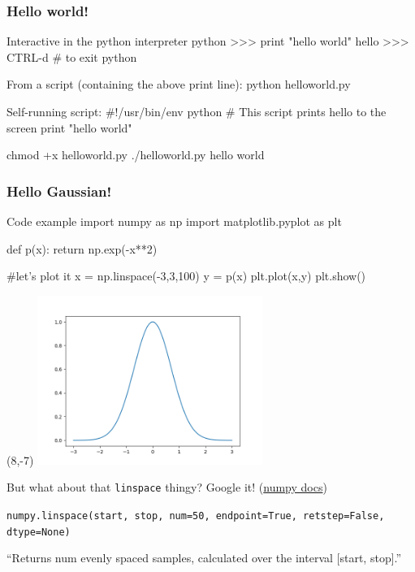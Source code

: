 \documentclass[hyperref={colorlinks=true}]{beamer}
\begin{document}
\begin{frame}[fragile]
  \frametitle{Hello world!}

  \begin{ucpythonblock}{Interactive in the python interpreter}
python
>>> print "hello world"
hello
>>> CTRL-d  # to exit python
  \end{ucpythonblock}
  
  \begin{ucpythonblock}{From a script (containing the above print line):}
python helloworld.py
  \end{ucpythonblock}
  
  \begin{ucpythonblock}{Self-running script:}
#!/usr/bin/env python
# This script prints hello to the screen
print "hello world"
  \end{ucpythonblock}
  
  \begin{ucpythonblock}{}
chmod +x helloworld.py
./helloworld.py
hello world
  \end{ucpythonblock}
  
\end{frame}


\begin{frame}[fragile]
  \frametitle{Hello Gaussian!}

\begin{ucpythonblock}{Code example}
import numpy as np
import matplotlib.pyplot as plt

def p(x):
    return np.exp(-x**2)
    
#let's plot it
x = np.linspace(-3,3,100)
y = p(x)
plt.plot(x,y)
plt.show()
\end{ucpythonblock}
  
  \pause

  \begin{textblock}{12}(8,-7)
    \includegraphics[width=0.55\textwidth]{Gaussian.png}
  \end{textblock}  
  
  \pause
  
  But what about that \texttt{linspace} thingy? Google it! (\href{https://docs.scipy.org/doc/numpy-1.15.0/reference/generated/numpy.linspace.html}{numpy docs})
  
  \texttt{numpy.linspace(start, stop, num=50, endpoint=True, retstep=False, dtype=None)}
  
  ``Returns num evenly spaced samples, calculated over the interval [start, stop].''
  
\end{frame}
\end{document}
